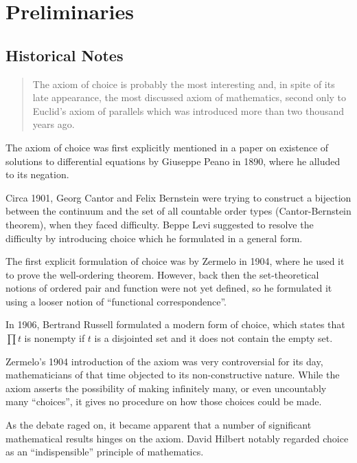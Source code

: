 \chapter{Preliminaries}
\section{Historical Notes}

\begin{quote}
    The axiom of choice is probably the most interesting and, in spite of its late appearance, the most discussed axiom of mathematics,
    second only to Euclid's axiom of parallels which was introduced more than two thousand years ago. \autocite{fraenkel1973}
\end{quote}
The axiom of choice was first explicitly mentioned in a paper on existence of solutions to differential equations by Giuseppe Peano in 1890,
where he alluded to its negation.

Circa 1901, Georg Cantor and Felix Bernstein were trying to construct a bijection between the continuum and the set of all countable order types (Cantor-Bernstein theorem), when they faced difficulty. Beppe Levi suggested to resolve the difficulty by introducing choice which he formulated in a general form.

The first explicit formulation of choice was by Zermelo in 1904, where he used it to prove the well-ordering theorem.
However, back then the set-theoretical notions of ordered pair and function were not yet defined, so he formulated it using a looser notion of ``functional correspondence''.

In 1906, Bertrand Russell formulated a modern form of choice, which states that \(\prod t\) is nonempty if \(t\) is a disjointed set and it does not contain the empty set.


Zermelo's 1904 introduction of the axiom was very controversial for its day, mathematicians of that time objected to its non-constructive nature.
While the axiom asserts the possibility of making infinitely many, or even uncountably many ``choices'', it gives no procedure on how those choices could be made.

As the debate raged on, it became apparent that a number of significant mathematical results hinges on the axiom.
David Hilbert notably regarded choice as an ``indispensible'' principle of mathematics.

